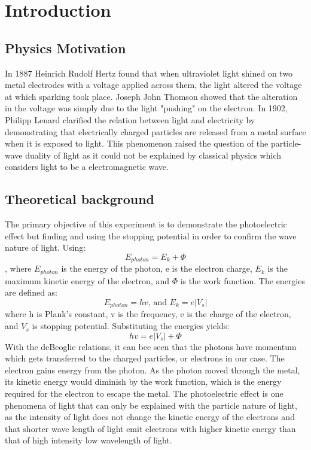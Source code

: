 \documentclass[11pt,letterpaper,onecolumn]{article}
\begin{document}
\section{Introduction}

\subsection{Physics Motivation}

In 1887 Heinrich Rudolf Hertz found that when ultraviolet light shined on two metal electrodes with a voltage applied across them, the light altered the voltage at which sparking took place. Joseph John Thomson showed that the alteration in the voltage was simply due to the light "pushing" on the electron. In 1902, Philipp Lenard clarified the relation between light and electricity by demonstrating that electrically charged particles are released from a metal surface when it is exposed to light. This phenomenon raised the question of the particle-wave duality of light as it could not be explained by classical physics which considers light to be a electromagnetic wave.~\cite{PE}

\subsection{Theoretical background}

The primary objective of this experiment is to demonstrate the photoelectric effect but finding and using the stopping potential in order to confirm the wave nature of light. Using:
$$E_{photon}=E_k+\Phi{}$$,
where $E_{photon}$ is the energy of the photon, e is the electron charge, $E_k$ is the maximum kinetic energy of the electron, and $\Phi{}$ is the work function. The energies are defined as:
$$E_{photon}=hv \text{, and } E_k=e|V_s|$$
where h is Plank's constant, v is the frequency, e is the charge of the electron, and $V_s$ is stopping potential. Substituting the energies yields:
$$hv=e|V_s|+\Phi{}$$
With the deBeoglie relations, it can bee seen that the photons have momentum which gets transferred to the charged particles, or electrons in our case. The electron gains energy from the photon. As the photon moved through the metal, its kinetic energy would diminish by the work function, which is the energy required for the electron to escape the metal.
The photoelectric effect is one phenomena of light that can only be explained with the particle nature of light, as the intensity of light does not change the kinetic energy of the electrons and that shorter wave length of light emit electrons with higher kinetic energy than that of high intensity low wavelength of light.~\cite{Nave}
\end{document}
